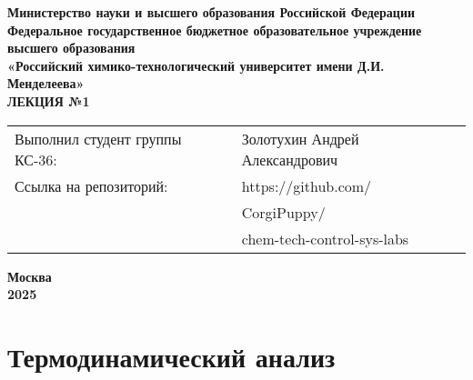 \documentclass[12pt, a4paper]{report}
\begin{document}
	\begin{titlepage}
		\begin{center}
			\large \textbf{Министерство науки и высшего образования Российской Федерации} \\
			\large \textbf{Федеральное государственное бюджетное образовательное учреждение высшего образования} \\
			\large \textbf{«Российский химико-технологический университет имени Д.И. Менделеева»} \\

			\vspace*{6cm}
			\LARGE \textbf{ЛЕКЦИЯ №1}

			\vspace*{4cm}
			\begin{flushright}
				\Large
				\begin{tabular}{>{\raggedleft\arraybackslash}p{9cm} p{10cm}}
					Выполнил студент группы КС-36: & Золотухин Андрей Александрович \\
					Ссылка на репозиторий: & https://github.com/ \\
					& CorgiPuppy/ \\
					& chem-tech-control-sys-labs \\
				\end{tabular}
			\end{flushright}

			\vspace*{5cm}
			\Large \textbf{Москва \\ 2025}
		\end{center}
	\end{titlepage}

	\tableofcontents
	\thispagestyle{empty}
	\newpage


	\section*{Термодинамический анализ}
\end{document}
